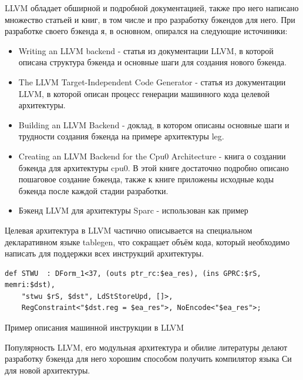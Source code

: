 \documentclass[a4paper,14pt]{extarticle}
\begin{document}
LLVM обладает обширной и подробной документацией, также про него написано множество статьей и книг, в том числе и про разработку бэкендов для него. При разработке своего бэкенда я, в основном, опирался на следующие источиники:
\begin{itemize}
	\item Writing an LLVM backend\cite{llvm:writing_backend} - статья из документации LLVM, в которой описана структура бэкенда и основные шаги для создания нового бэкенда.
	\item The LLVM Target-Independent Code Generator\cite{llvm:codegen} - статья из документации LLVM, в которой описан процесс генерации машинного кода целевой архитектуры.
	\item Building an LLVM Backend\cite{llvmleg} - доклад, в котором описаны основные шаги и трудности создания бэкенда на примере архитектуры leg.
	\item Creating an LLVM Backend for the Cpu0 Architecture\cite{cpu0} - книга о создании бэкенда для архитектуры cpu0. В этой книге достаточно подробно описано пошаговое создание бэкенда, также к книге приложены исходные коды бэкенда после каждой стадии разработки.
	\item Бэкенд LLVM для архитектуры Sparc\cite{llvm:sparc} - использован как пример
\end{itemize}

Целевая архитектура в LLVM частично описывается на специальном декларативном языке tablegen, что сокращает объём кода, который необходимо написать для поддержки всех инструкций архитектуры\cite{llvm:codegen}.
\begin{listing}[h!]
	\begin{verbatim}
def STWU  : DForm_1<37, (outs ptr_rc:$ea_res), (ins GPRC:$rS, memri:$dst),
	"stwu $rS, $dst", LdStStoreUpd, []>,
	RegConstraint<"$dst.reg = $ea_res">, NoEncode<"$ea_res">;
	\end{verbatim}
	\caption{Пример описания машинной инструкции в LLVM\cite{llvm:codegen}}
\end{listing}

Популярность  LLVM, его модульная архитектура и обилие литературы делают разработку бэкенда для него хорошим способом получить компилятор языка Си для новой архитектуры.
\end{document}
